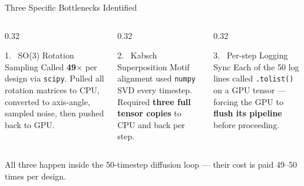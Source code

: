\documentclass[aspectratio=169, 10pt]{beamer}
\begin{document}
\begin{frame}{Three Specific Bottlenecks Identified}
\vspace{0.3cm}
\begin{columns}[T]
\begin{column}{0.32\textwidth}
  \begin{block}{\textcolor{CPURed}{1.} \ SO(3) Rotation Sampling}
    \small
    Called \textbf{49$\times$} per design via \texttt{scipy}. Pulled all rotation matrices to CPU, converted to axis-angle, sampled noise, then pushed back to GPU.
  \end{block}
\end{column}
\begin{column}{0.32\textwidth}
  \begin{block}{\textcolor{CPURed}{2.} \ Kabsch Superposition}
    \small
    Motif alignment used \texttt{numpy} SVD every timestep. Required \textbf{three full tensor copies} to CPU and back per step.
  \end{block}
\end{column}
\begin{column}{0.32\textwidth}
  \begin{block}{\textcolor{CPURed}{3.} \ Per-step Logging Sync}
    \small
    Each of the 50 log lines called \texttt{.tolist()} on a GPU tensor — forcing the GPU to \textbf{flush its pipeline} before proceeding.
  \end{block}
\end{column}
\end{columns}
\vspace{0.5cm}
\begin{center}
\small\textcolor{MidGray}{All three happen inside the 50-timestep diffusion loop — their cost is paid 49--50 times per design.}
\end{center}
\end{frame}
\end{document}
